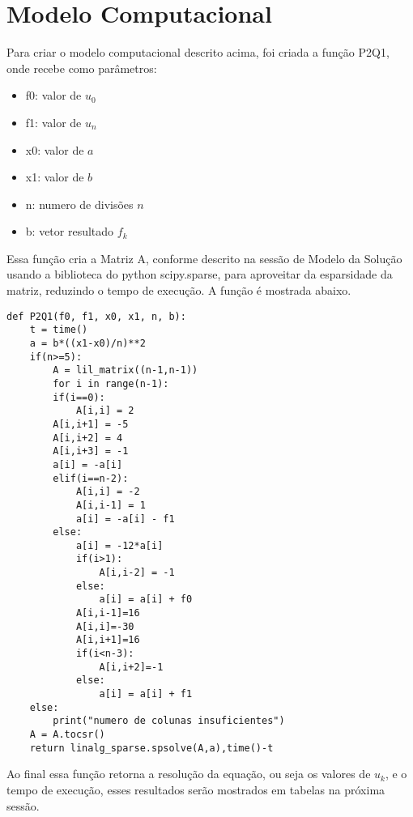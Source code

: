 \documentclass[a4paper,10pt]{article}
\begin{document}
\section{Modelo Computacional}
Para criar o modelo computacional descrito acima, foi criada a função P2Q1, onde recebe como parâmetros:
\begin{itemize}
\item f0: valor de $u_0$
\item f1: valor de $u_n$
\item x0: valor de $a$
\item x1: valor de $b$
\item n:  numero de divisões $n$
\item b:  vetor resultado $f_k$
\end{itemize}
Essa função cria a Matriz A, conforme descrito na sessão de Modelo da Solução usando a biblioteca do python scipy.sparse, para aproveitar da esparsidade da matriz, reduzindo o tempo de execução. A função é mostrada abaixo.\\
\begin{lstlisting}
def P2Q1(f0, f1, x0, x1, n, b):
    t = time()
    a = b*((x1-x0)/n)**2
    if(n>=5):
        A = lil_matrix((n-1,n-1))
        for i in range(n-1):
        if(i==0):
			A[i,i] = 2
		A[i,i+1] = -5
		A[i,i+2] = 4
		A[i,i+3] = -1
		a[i] = -a[i]
		elif(i==n-2):
			A[i,i] = -2
			A[i,i-1] = 1
			a[i] = -a[i] - f1
		else:
			a[i] = -12*a[i]
			if(i>1):
				A[i,i-2] = -1
			else:
				a[i] = a[i] + f0
			A[i,i-1]=16
			A[i,i]=-30
			A[i,i+1]=16
			if(i<n-3):
				A[i,i+2]=-1
			else:
				a[i] = a[i] + f1
	else:
		print("numero de colunas insuficientes")
	A = A.tocsr()
	return linalg_sparse.spsolve(A,a),time()-t
\end{lstlisting}
Ao final essa função retorna a resolução da equação, ou seja os valores de $u_k$, e o tempo de execução, esses resultados serão mostrados em tabelas na próxima sessão.
\end{document}
